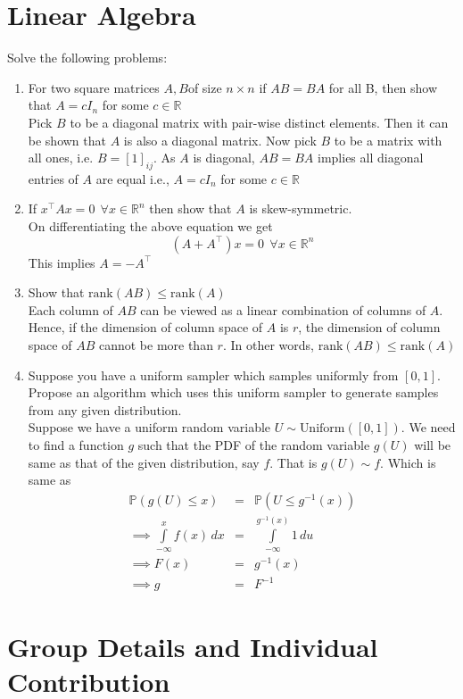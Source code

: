\documentclass[11pt, twosides]{article}
\begin{document}
\section{Linear Algebra}
Solve the following problems:
\begin{enumerate}
    \item For two square matrices $A, B$of size $n\times n$ if $AB = BA$ for all B, then show that $A = cI_n$ for some $c \in \mathbb{R}$\\
    \color{blue}
    Pick $B$ to be a diagonal matrix with pair-wise distinct elements. Then it can be shown that $A$ is also a diagonal matrix. Now pick $B$ to be a matrix with all ones, i.e. $B = [1]_{ij}$. As $A$ is diagonal, $AB=BA$ implies all diagonal entries of $A$ are equal i.e., $A = cI_n$ for some $c \in \mathbb{R}$
    \color{black}
    \item If $x^\top A x = 0\:\: \forall x \in \mathbb{R}^n$ then show that $A$ is skew-symmetric.\\
    \color{blue}
    On differentiating the above equation we get
    $$(A + A^\top)x = 0 \:\: \forall x \in \mathbb{R}^n$$
    This implies $A = -A^\top$
    \color{black}
    \item Show that $\text{rank}(AB) \leq \text{rank}(A)$\\
    \color{blue} Each column of $AB$ can be viewed as a linear combination of columns of $A$. Hence, if the dimension of column space of $A$ is $r$, the dimension of column space of $AB$ cannot be more than $r$. In other words,
    $\text{rank}(AB) \leq \text{rank}(A)$
    \color{black}
    \item Suppose you have a uniform sampler which samples uniformly from $[0, 1]$. Propose an algorithm which uses this uniform sampler to generate samples from any given distribution.\\
    \color{blue}
    Suppose we have a uniform random variable $U \sim \text{Uniform}([0, 1])$. We need to find a function $g$ such that the PDF of the random variable $g(U)$ will be same as that of the given distribution, say $f$. That is $g(U) \sim f$. Which is same as
    \begin{eqnarray*}
    \mathbb{P}(g(U) \leq x) &=& \mathbb{P}(U \leq g^{-1}(x))\\
    \implies \int \limits_{-\infty}^x f(x) \, dx &=& \int \limits_{-\infty}^{g^{-1}(x)} 1 \, du\\
    \implies F(x) &=& g^{-1}(x)\\
    \implies g &=& F^{-1}
    \end{eqnarray*}
    \color{black}
\end{enumerate}
\section{Group Details and Individual Contribution}
\end{document}
